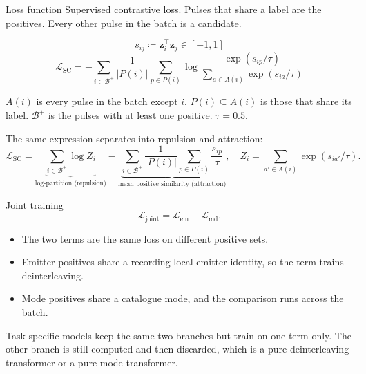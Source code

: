 \documentclass[aspectratio=169,10pt]{beamer}
\newcommand{\vect}[1]{\bm{#1}}
\newcommand{\Loss}{\mathcal{L}}
\begin{document}
\begin{frame}{Loss function}
  Supervised contrastive loss. Pulses that share a label are the positives. Every other pulse in the batch is a candidate.

  \vspace{0.15em}
  {\small
  \[
    s_{ij} \coloneqq \vect{z}_i^{\top}\vect{z}_j \in [-1,1]
  \]
  \[
    \Loss_{\mathrm{SC}}
    = -\sum_{i \in \mathcal{B}^{+}} \frac{1}{\lvert P(i)\rvert}
      \sum_{p \in P(i)}
      \log \frac{\exp(s_{ip}/\tau)}{\sum_{a \in A(i)}\exp(s_{ia}/\tau)}
  \]}

  \vspace{0.15em}
  {\footnotesize
  \(A(i)\) is every pulse in the batch except \(i\).
  \(P(i)\subseteq A(i)\) is those that share its label.
  \(\mathcal{B}^{+}\) is the pulses with at least one positive.
  \(\tau = 0.5\).}

  \vspace{0.45em}
  The same expression separates into repulsion and attraction:
  {\small
  \[
    \Loss_{\mathrm{SC}}
    =
    \underbrace{\sum_{i\in\mathcal{B}^{+}}\log Z_i}_{\text{log-partition (repulsion)}}
    -
    \underbrace{\sum_{i\in\mathcal{B}^{+}}\frac{1}{\lvert P(i)\rvert}
      \sum_{p\in P(i)}\frac{s_{ip}}{\tau}}_{\text{mean positive similarity (attraction)}},
    \quad
    Z_i = \sum_{a'\in A(i)}\exp(s_{ia'}/\tau).
  \]}
\end{frame}

\begin{frame}{Joint training}
  \vspace{0.4em}
  \[
    \Loss_{\mathrm{joint}} = \Loss_{\mathrm{em}} + \Loss_{\mathrm{md}}.
  \]
  \vspace{0.2em}
  \begin{itemize}
    \item The two terms are the same loss on different positive sets.
    \item Emitter positives share a recording-local emitter identity, so the term trains deinterleaving.
    \item Mode positives share a catalogue mode, and the comparison runs across the batch.
  \end{itemize}
  \vspace{0.4em}
  Task-specific models keep the same two branches but train on one term only.
  The other branch is still computed and then discarded, which is a pure deinterleaving transformer or a pure mode transformer.
\end{frame}
\end{document}
